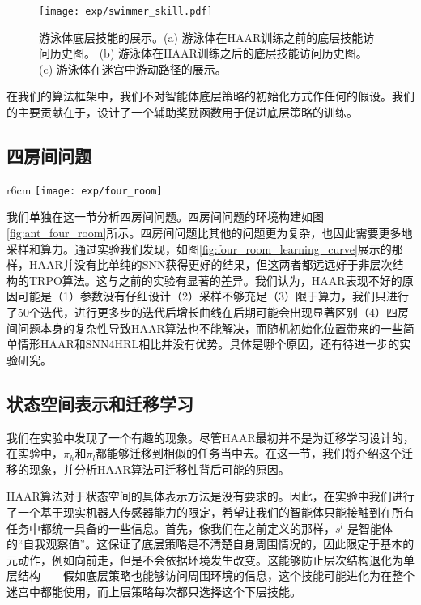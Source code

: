 \begin{figure}[htbp]
    \centering
    \texttt{[image: exp/swimmer\_skill.pdf]}
    \caption{游泳体底层技能的展示。(a) 游泳体在HAAR训练之前的底层技能访问历史图。 (b) 游泳体在HAAR训练之后的底层技能访问历史图。 (c) 游泳体在迷宫中游动路径的展示。 }
    \label{fig:swimmer_skill}
\end{figure}

在我们的算法框架中，我们不对智能体底层策略的初始化方式作任何的假设。我们的主要贡献在于，设计了一个辅助奖励函数用于促进底层策略的训练。

\subsection{四房间问题}

\begin{wrapfigure}{r}{6cm}
\texttt{[image: exp/four\_room]}
\setlength{\belowcaptionskip}{-1.0cm}
\caption{四房间问题当中，HAAR算法和SNN4HRL算法的对比，没有显著差异。}
\label{fig:four_room_learning_curve}
\end{wrapfigure}

我们单独在这一节分析四房间问题。四房间问题的环境构建如图\ref{fig:ant_four_room}所示。四房间问题比其他的问题更为复杂，也因此需要更多地采样和算力。通过实验我们发现，如图\ref{fig:four_room_learning_curve}展示的那样，HAAR并没有比单纯的SNN获得更好的结果，但这两者都远远好于非层次结构的TRPO算法。这与之前的实验有显著的差异。我们认为，HAAR表现不好的原因可能是（1）参数没有仔细设计（2）采样不够充足（3）限于算力，我们只进行了50个迭代，进行更多步的迭代后增长曲线在后期可能会出现显著区别（4）四房间问题本身的复杂性导致HAAR算法也不能解决，而随机初始化位置带来的一些简单情形HAAR和SNN4HRL相比并没有优势。具体是哪个原因，还有待进一步的实验研究。

\subsection{状态空间表示和迁移学习}\label{sec:transfer}
我们在实验中发现了一个有趣的现象。尽管HAAR最初并不是为迁移学习设计的，在实验中，$\pi_h$和$\pi_l$都能够迁移到相似的任务当中去。在这一节，我们将介绍这个迁移的现象，并分析HAAR算法可迁移性背后可能的原因。

HAAR算法对于状态空间的具体表示方法是没有要求的。因此，在实验中我们进行了一个基于现实机器人传感器能力的限定，希望让我们的智能体只能接触到在所有任务中都统一具备的一些信息。首先，像我们在之前定义的那样，$s^l$ 是智能体的``自我观察值''。这保证了底层策略是不清楚自身周围情况的，因此限定于基本的元动作，例如向前走，但是不会依据环境发生改变。这能够防止层次结构退化为单层结构——假如底层策略也能够访问周围环境的信息，这个技能可能进化为在整个迷宫中都能使用，而上层策略每次都只选择这个下层技能\cite{feudal}\cite{option-critic}。

